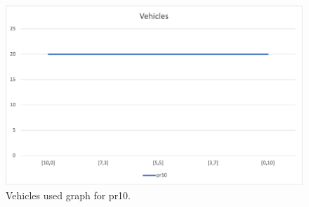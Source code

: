\begin{figure}[H]
    \centering
    \includegraphics[height=0.25\textheight]{../graphs/pr10-vehicles.png}
    \caption{Vehicles used graph for pr10.}
\end{figure}

\newpage